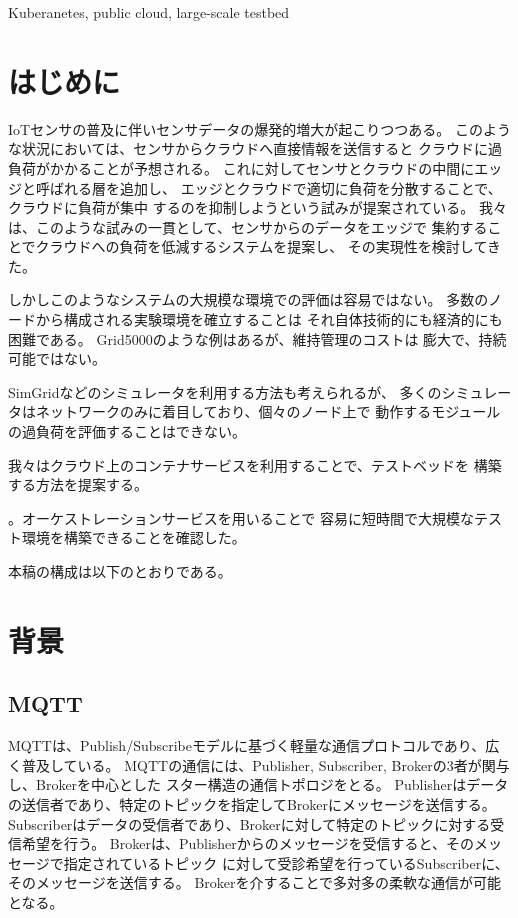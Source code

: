 \documentclass[submit,techrep]{ipsj}
\begin{document}
\begin{ekeyword}
  Kuberanetes, public cloud, large-scale testbed
\end{ekeyword}

\maketitle

\section{はじめに}

IoTセンサの普及に伴いセンサデータの爆発的増大が起こりつつある。
このような状況においては、センサからクラウドへ直接情報を送信すると
クラウドに過負荷がかかることが予想される。
これに対してセンサとクラウドの中間にエッジと呼ばれる層を追加し、
エッジとクラウドで適切に負荷を分散することで、クラウドに負荷が集中
するのを抑制しようという試みが提案されている。
我々は、このような試みの一貫として、センサからのデータをエッジで
集約することでクラウドへの負荷を低減するシステムを提案し、
その実現性を検討してきた\cite{tou-os}。

しかしこのようなシステムの大規模な環境での評価は容易ではない。
多数のノードから構成される実験環境を確立することは
それ自体技術的にも経済的にも困難である。
Grid5000\cite{grid5000}のような例はあるが、維持管理のコストは
膨大で、持続可能ではない。

SimGrid\cite{simgrid}などのシミュレータを利用する方法も考えられるが、
多くのシミュレータはネットワークのみに着目しており、個々のノード上で
動作するモジュールの過負荷を評価することはできない。

我々はクラウド上のコンテナサービスを利用することで、テストベッドを
構築する方法を提案する\cite{tou-hpc}。


。オーケストレーションサービスを用いることで
容易に短時間で大規模なテスト環境を構築できることを確認した。


本稿の構成は以下のとおりである。

\section{背景}\label{sec:background}


\subsection{MQTT}
MQTT\cite{MQTT}は、Publish/Subscribeモデルに基づく軽量な通信プロトコルであり、広く普及している。
MQTTの通信には、Publisher, Subscriber, Brokerの3者が関与し、Brokerを中心とした
スター構造の通信トポロジをとる。
Publisherはデータの送信者であり、特定のトピックを指定してBrokerにメッセージを送信する。
Subscriberはデータの受信者であり、Brokerに対して特定のトピックに対する受信希望を行う。
Brokerは、Publisherからのメッセージを受信すると、そのメッセージで指定されているトピック
に対して受診希望を行っているSubscriberに、そのメッセージを送信する。
Brokerを介することで多対多の柔軟な通信が可能となる。
\end{document}
